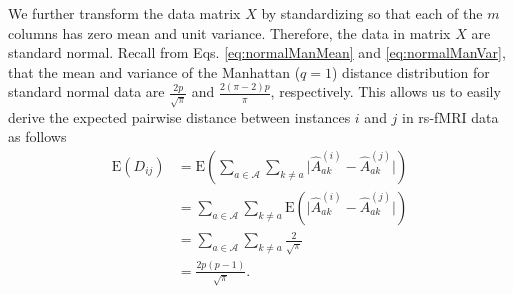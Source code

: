\documentclass[10pt,letterpaper]{article}\usepackage[]{graphicx}\usepackage[]{color}
\begin{document}
We further transform the data matrix $X$ by standardizing so that each of the $m$ columns has zero mean and unit variance. Therefore, the data in matrix $X$ are standard normal. Recall from Eqs. \ref{eq:normalManMean} and \ref{eq:normalManVar}, that the mean and variance of the Manhattan ($q=1$) distance distribution for standard normal data are $\frac{2p}{\sqrt{\pi}}$ and $\frac{2(\pi - 2)p}{\pi}$, respectively. This allows us to easily derive the expected pairwise distance between instances $i$ and $j$ in rs-fMRI data as follows
%
\begin{equation}\label{eq:mu_DDistr_rs-fMRI}
\begin{aligned}
\text{E}(D_{ij}) &= \text{E}\left(\sum_{a \in \mathcal{A}} \sum_{k \neq a} \bigl|\hat{A}^{(i)}_{ak} - \hat{A}^{(j)}_{ak}\bigr|\right) \\
&= \sum_{a \in \mathcal{A}} \sum_{k \neq a} \text{E}\left(\bigl|\hat{A}^{(i)}_{ak} - \hat{A}^{(j)}_{ak}\bigr|\right) \\
&= \sum_{a \in \mathcal{A}} \sum_{k \neq a} \frac{2}{\sqrt{\pi}} \\
&= \frac{2p(p-1)}{\sqrt{\pi}}.
\end{aligned}
\end{equation}
\end{document}
